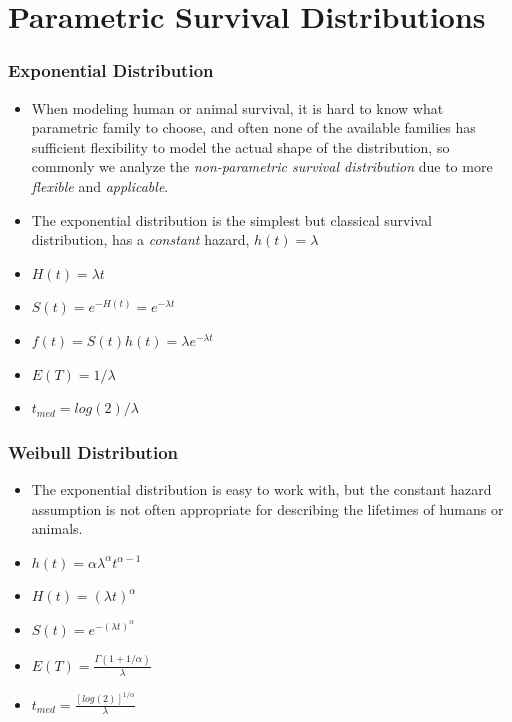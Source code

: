 \documentclass{beamer}
\newcommand{\empr}[1]{{\emph{\color{red}#1}}}
\begin{document}
\section{Parametric Survival Distributions}
\begin{frame}
\frametitle{Exponential Distribution }
\begin{itemize}
\item When modeling human or animal survival, it is hard to know what parametric family to choose, and often none of the available families has sufficient flexibility to model the actual shape of the distribution, so commonly we analyze the \empr{non-parametric survival distribution} due to more \empr{flexible} and \empr{applicable}.
\item The exponential distribution is the simplest but classical survival distribution, has a \empr{constant} hazard, {\color{red} $h(t)=\lambda$}
\item \empr{$H(t)=\lambda t$}
\item \empr{$S(t)=e ^{-H(t)}=e^{-\lambda t}$}
\item \empr{$f(t)=S(t)h(t)=\lambda e^{-\lambda t}$}
\item $E(T) = 1/ \lambda$
\item $t_{med} = log(2)/\lambda$

\end{itemize}
\end{frame}

\pagebreak
\begin{frame}
\frametitle{Weibull Distribution }
\begin{itemize}
	\item The exponential distribution is easy to work with, but the constant hazard assumption is not often appropriate for describing the lifetimes of humans or animals.
	\item \empr{$h(t)=\alpha\lambda^{\alpha}t^{\alpha-1}$}
	\item \empr{$H(t)=(\lambda t)^{\alpha}$}
	\item \empr{$S(t)=e ^{-(\lambda t)^{\alpha}}$}
	\item $E(T) = \frac{\Gamma(1+1/\alpha)}{\lambda}$
	\item $t_{med} = \frac{[log(2)]^{1/\alpha}}{\lambda}$	
\end{itemize}
\end{frame}
\end{document}
